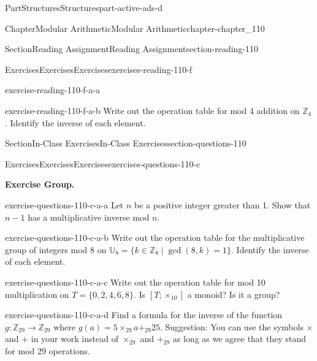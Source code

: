\documentclass[oneside,10pt,]{book}
\numberwithin{equation}{section}
\begin{document}
\begin{partptx}{Part}{Structures}{}{Structures}{}{}{part-active-ads-d}
\begin{chapterptx}{Chapter}{Modular Arithmetic}{}{Modular Arithmetic}{}{}{chapter-chapter_110}
\begin{sectionptx}{Section}{Reading Assignment}{}{Reading Assignment}{}{}{section-reading-110}
\begin{exercises-subsection-numberless}{Exercises}{Exercises}{}{Exercises}{}{}{exercises-reading-110-f}
\begin{exercisegroup}
\begin{divisionexerciseeg}{1}{}{}{exercise-reading-110-f-a-a}
\end{divisionexerciseeg}%
\begin{divisionexerciseeg}{2}{}{}{exercise-reading-110-f-a-b}%
Write out the operation table for mod 4 addition on \(\mathbb{Z}_4\).  Identify the inverse of each element.%
\end{divisionexerciseeg}%
\end{exercisegroup}
\par\medskip\noindent
\end{exercises-subsection-numberless}
\end{sectionptx}
%
%
\typeout{************************************************}
\typeout{************************************************}
%
\begin{sectionptx}{Section}{In-Class Exercises}{}{In-Class Exercises}{}{}{section-questions-110}
%
%
%
\typeout{************************************************}
\typeout{************************************************}
%
\begin{exercises-subsection-numberless}{Exercises}{Exercises}{}{Exercises}{}{}{exercises-questions-110-c}
\par\medskip\noindent%
\textbf{Exercise Group.}\space\space%
\begin{exercisegroup}
\begin{divisionexerciseeg}{1}{}{}{exercise-questions-110-c-a-a}%
Let \(n\) be a positive integer greater than 1.  Show that \(n-1\) has a multiplicative inverse mod \(n\).%
\end{divisionexerciseeg}%
\begin{divisionexerciseeg}{2}{}{}{exercise-questions-110-c-a-b}%
Write out the operation table for the multiplicative group of integers mod 8  on \(\mathbb{U}_8= \{k \in \mathbb{Z}_8 \mid \gcd{(8,k)}=1\}\).  Identify the inverse of each element.%
\end{divisionexerciseeg}%
\begin{divisionexerciseeg}{3}{}{}{exercise-questions-110-c-a-c}%
Write out the operation table for mod 10 multiplication on \(T=\{0,2,4,6,8\}\). Is \([T;\times_{10}]\)	 a monoid? Is it a group?%
\end{divisionexerciseeg}%
\begin{divisionexerciseeg}{4}{}{}{exercise-questions-110-c-a-d}%
Find a formula for the inverse of the function \(g: \mathbb{Z}_{29} \rightarrow  \mathbb{Z}_{29}\) where \(g(a)= 5\times_{29}a +_{29}25\).  Suggestion:  You can use the symbols \(\times\) and \(+\) in your work instead of \(\times_{29}\) and \(+_{29}\) as long as we agree that they stand for mod 29 operations.%

\end{divisionexerciseeg}
\end{exercisegroup}
\end{exercises-subsection-numberless}
\end{sectionptx}
\end{chapterptx}
\end{partptx}
\end{document}
